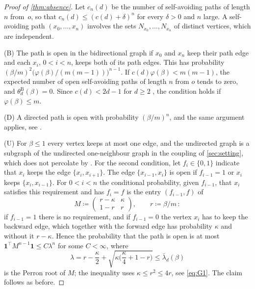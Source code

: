 \documentclass[11pt,letterpaper]{article}
\begin{document}
\begin{proof}[Proof of \cref{thm:absence}]
Let $c_n(d)$ be the number of self-avoiding paths of length $n$ from~$o$, so that $c_n(d)\le(c(d)+\delta)^n$ for every $\delta>0$ and $n$ large. A self-avoiding path $(x_0,\dots,x_n)$ involves the sets $N_{x_0},\dots,N_{x_n}$ of distinct vertices, which are independent.

(B) The path is open in the bidirectional graph if $x_0$ and $x_n$ keep their path edge and each $x_i$, $0<i<n$, keeps both of its path edges. This has probability $(\beta/m)^2\big(\varphi(\beta)/(m(m-1))\big)^{n-1}$. If $c(d)\varphi(\beta)<m(m-1)$, the expected number of open self-avoiding paths of length $n$ from $o$ tends to zero, and $\theta^{\mathrm B}_d(\beta)=0$. Since $c(d)<2d-1$ for $d\ge2$ \cite[Section~2.3]{JKLT25}, the condition holds if $\varphi(\beta)\le m$.

(D) A directed path is open with probability $(\beta/m)^n$, and the same argument applies, see \cite[Lemma~2.2]{CHJK26}.

(U) For $\beta\le1$ every vertex keeps at most one edge, and the undirected graph is a subgraph of the undirected one-neighbour graph in the coupling of \cref{sec:setting}, which does not percolate by \cite[Proposition~2.5]{JKLT25}. For the second condition, let $f_i\in\{0,1\}$ indicate that $x_i$ keeps the edge $\{x_i,x_{i+1}\}$. The edge $\{x_{i-1},x_i\}$ is open if $f_{i-1}=1$ or $x_i$ keeps $\{x_i,x_{i-1}\}$. For $0<i<n$ the conditional probability, given $f_{i-1}$, that $x_i$ satisfies this requirement and has $f_i=f$ is the entry $(f_{i-1},f)$ of
\begin{equation*}
M\coloneqq\begin{pmatrix}r-\kappa  & \kappa\\1-r&r\end{pmatrix},\qquad r\coloneqq\beta/m\,:
\end{equation*}
if $f_{i-1}=1$ there is no requirement, and if $f_{i-1}=0$ the vertex $x_i$ has to keep the backward edge, which together with the forward edge has probability $\kappa$ and without it $r-\kappa$. Hence the probability that the path is open is at most $\mathbf 1^{\top}M^{n-1}\mathbf 1\le C\lambda^n$ for some $C<\infty$, where
\begin{equation*}
\lambda=r-\frac \kappa2+\sqrt{\kappa\Big(\frac \kappa4+1-r\Big)}\le\bar\lambda_d(\beta)
\end{equation*}
is the Perron root of $M$; the inequality uses $\kappa\le r^2\le4r$, see \eqref{eq:G1}. The claim follows as before.
\end{proof}
\end{document}
